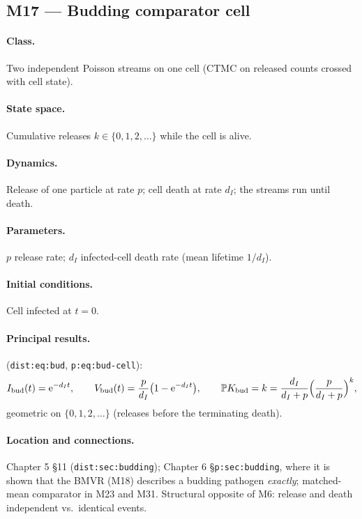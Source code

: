 \documentclass[11pt,a4paper]{article}
\newcommand{\PR}{\mathbb{P}}
\newcommand{\ee}{\mathrm{e}}
\begin{document}
\subsection{M17 --- Budding comparator cell}

\paragraph{Class.} Two independent Poisson streams on one cell (CTMC on
released counts crossed with cell state).

\paragraph{State space.} Cumulative releases $k\in\{0,1,2,\ldots\}$ while
the cell is alive.

\paragraph{Dynamics.} Release of one particle at rate $p$; cell death at
rate $d_I$; the streams run until death.

\paragraph{Parameters.} $p$ release rate; $d_I$ infected-cell death rate
(mean lifetime $1/d_I$).

\paragraph{Initial conditions.} Cell infected at $t=0$.

\paragraph{Principal results.} (\texttt{dist:eq:bud}, \texttt{p:eq:bud-cell}):
\[
I_{\rm bud}(t)=\ee^{-d_It},\qquad
V_{\rm bud}(t)=\frac{p}{d_I}\bigl(1-\ee^{-d_It}\bigr),\qquad
\PR{K_{\rm bud}=k}=\frac{d_I}{d_I+p}\Bigl(\frac{p}{d_I+p}\Bigr)^{k},
\]
geometric on $\{0,1,2,\ldots\}$ (releases before the terminating death).

\paragraph{Location and connections.} Chapter 5 \S11
(\texttt{dist:sec:budding}); Chapter 6 \S\texttt{p:sec:budding}, where it
is shown that the BMVR (M18) describes a budding pathogen \emph{exactly};
matched-mean comparator in M23 and M31. Structural opposite of M6: release
and death independent vs.\ identical events.
\end{document}
